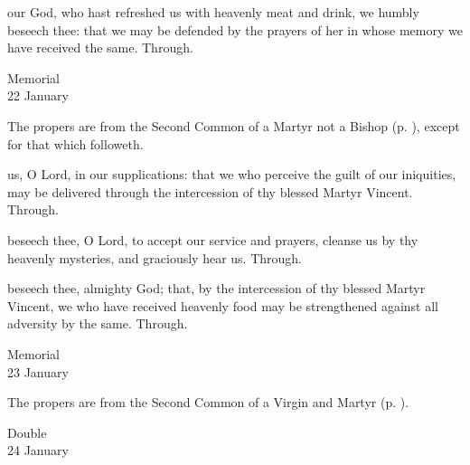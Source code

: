 
\postcommunion
{} our God, who hast refreshed us with heavenly meat and drink, we humbly beseech thee: that we may be defended by the prayers of her in whose memory we have received the same. Through.

\begin{inhead}
    {Memorial\\
22 January}
\end{inhead}

\begin{rubric}
	The propers are from the Second Common of a Martyr not a Bishop (p. \pageref{CommonMartyrNotBishopII}), except for that which followeth.
\end{rubric}

\collect
{} us, O Lord, in our supplications: that we who perceive the guilt of our iniquities, may be delivered through the intercession of thy blessed Martyr Vincent. Through.

\secret
{} beseech thee, O Lord, to accept our service and prayers, cleanse us by thy heavenly mysteries, and graciously hear us. Through.

\postcommunion
{} beseech thee, almighty God; that, by the intercession of thy blessed Martyr Vincent, we who have received heavenly food may be strengthened against all adversity by the same. Through.


\begin{inhead}
    {Memorial\\
23 January}
\end{inhead}

\begin{rubric}
	The propers are from the Second Common of a Virgin and Martyr (p. \pageref{CommonVirginMartyrII}).
\end{rubric}


\begin{inhead}
    {Double\\
24 January}
\end{inhead}

